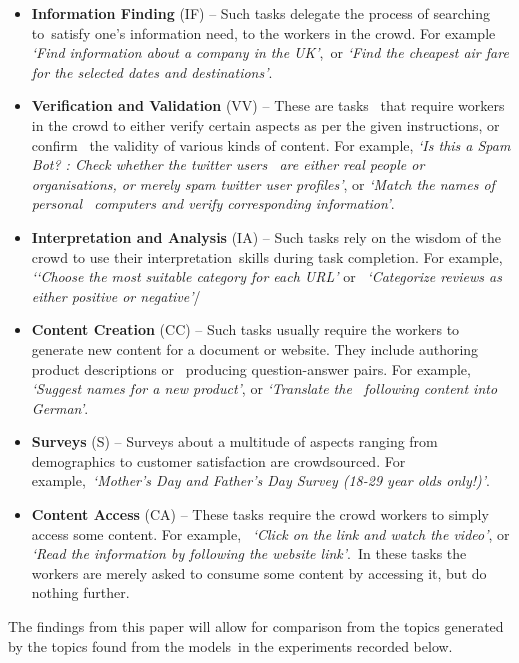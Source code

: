 \documentclass[letterpaper,12pt]{article}
\begin{document}
\begin{itemize}
	\item \textbf{Information Finding} (IF) -- Such tasks delegate the process of searching to\
	 satisfy one’s information need, to the workers in the crowd. For example \emph{`Find information about a company in the UK'},\
	 or \emph{`Find the cheapest air fare for the selected dates and destinations'}.
	 \item \textbf{Verification and Validation} (VV) -- These are tasks \
	 that require workers in the crowd to either verify certain aspects as per the given instructions, or confirm \
	 the validity of various kinds of content. For example, \emph{`Is this a Spam Bot? : Check whether the twitter users \
	 are either real people or organisations, or merely spam twitter user profiles'}, or \emph{`Match the names of personal \
	 computers and verify corresponding information'}.
	 \item \textbf{Interpretation and Analysis} (IA) --  Such tasks rely on the wisdom of the crowd to use their interpretation\
		skills during task completion. For example, \emph{`‘Choose the most suitable category for each URL'} or \
		\emph{`Categorize reviews as either positive or negative'}/
	\item \textbf{Content Creation} (CC) -- Such tasks usually require
	the workers to generate new content for a document or website. They include authoring product descriptions or \
	producing question-answer pairs. For example, \emph{`Suggest names for a new product'}, or \emph{`Translate the \
	following content into German'}.
	\item \textbf{Surveys} (S) -- Surveys about a multitude of aspects ranging from demographics to customer satisfaction are crowdsourced. For example,\
	\emph{`Mother’s Day and Father’s Day Survey (18-29 year olds only!)'}.
	\item \textbf{Content Access} (CA) -- These tasks require the crowd workers to simply access some content. For example, \
	\emph{`Click on the link and watch the video'}, or \emph{`Read the information by following the website link'}.\
	In these tasks the workers are merely asked to consume some content by accessing it, but do nothing further.
\end{itemize}

The findings from this paper will allow for comparison from the topics generated by the topics found from the models\
in the experiments recorded below.
\end{document}
